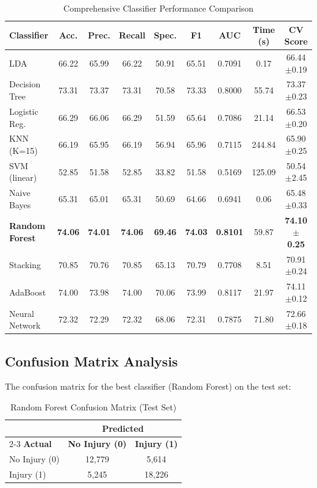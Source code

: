 \documentclass[stu,12pt,floatsintext]{apa7}
\begin{document}
\begin{table}[H]
\centering
\caption{Comprehensive Classifier Performance Comparison}
\scriptsize
\begin{tabular}{lcccccccc}
\toprule
\textbf{Classifier} & \textbf{Acc.} & \textbf{Prec.} & \textbf{Recall} & \textbf{Spec.} & \textbf{F1} & \textbf{AUC} & \textbf{Time (s)} & \textbf{CV Score} \\
\midrule
LDA & 66.22 & 65.99 & 66.22 & 50.91 & 65.51 & 0.7091 & 0.17 & 66.44$\pm$0.19 \\
Decision Tree & 73.31 & 73.37 & 73.31 & 70.58 & 73.33 & 0.8000 & 55.74 & 73.37$\pm$0.23 \\
Logistic Reg. & 66.29 & 66.06 & 66.29 & 51.59 & 65.64 & 0.7086 & 21.14 & 66.53$\pm$0.20 \\
KNN (K=15) & 66.19 & 65.95 & 66.19 & 56.94 & 65.96 & 0.7115 & 244.84 & 65.90$\pm$0.25 \\
SVM (linear) & 52.85 & 51.58 & 52.85 & 33.82 & 51.58 & 0.5169 & 125.09 & 50.54$\pm$2.45 \\
Naive Bayes & 65.31 & 65.01 & 65.31 & 50.69 & 64.66 & 0.6941 & 0.06 & 65.48$\pm$0.33 \\
\textbf{Random Forest} & \textbf{74.06} & \textbf{74.01} & \textbf{74.06} & \textbf{69.46} & \textbf{74.03} & \textbf{0.8101} & 59.87 & \textbf{74.10$\pm$0.25} \\
Stacking & 70.85 & 70.76 & 70.85 & 65.13 & 70.79 & 0.7708 & 8.51 & 70.91$\pm$0.24 \\
AdaBoost & 74.00 & 73.98 & 74.00 & 70.06 & 73.99 & 0.8117 & 21.97 & 74.11$\pm$0.12 \\
Neural Network & 72.32 & 72.29 & 72.32 & 68.06 & 72.31 & 0.7875 & 71.80 & 72.66$\pm$0.18 \\
\bottomrule
\end{tabular}
\end{table}

\subsection{Confusion Matrix Analysis}

The confusion matrix for the best classifier (Random Forest) on the test set:

\begin{table}[H]
\centering
\caption{Random Forest Confusion Matrix (Test Set)}
\begin{tabular}{lcc}
\toprule
& \multicolumn{2}{c}{\textbf{Predicted}} \\
\cmidrule(lr){2-3}
\textbf{Actual} & \textbf{No Injury (0)} & \textbf{Injury (1)} \\
\midrule
No Injury (0) & 12,779 & 5,614 \\
Injury (1) & 5,245 & 18,226 \\
\bottomrule
\end{tabular}
\end{table}
\end{document}
